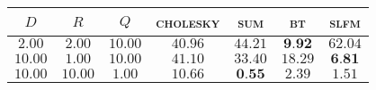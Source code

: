 
\begin{tabular}{|ccc|cccc|}
  \hline
  \abovespace\belowspace
  $D$ & $R$ & $Q$ & \textsc{cholesky} & \textsc{sum} & \textsc{bt} & \textsc{slfm}\\
\hline
  \abovespace
 $ 2.00 $ & $ 2.00 $ & $ 10.00 $ & $ 40.96 $ & $ 44.21 $ & $ \textbf{9.92} $ & $ 62.04 $ \\ 
 $ 10.00 $ & $ 1.00 $ & $ 10.00 $ & $ 41.10 $ & $ 33.40 $ & $ 18.29 $ & $ \textbf{6.81} $ \\ 
 $ 10.00 $ & $ 10.00 $ & $ 1.00 $ & $ 10.66 $ & $ \textbf{0.55} $ & $ 2.39 $ & $ 1.51 $ 
  \belowspace \\

  \hline
\end{tabular}
